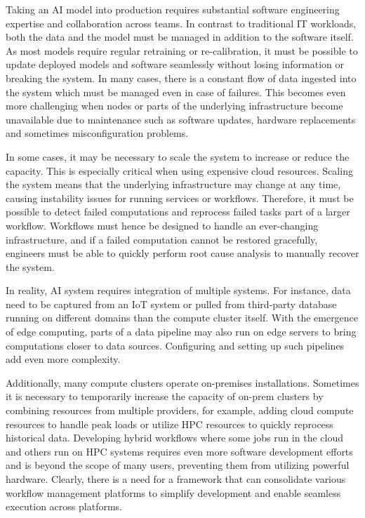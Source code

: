 \documentclass{article}
\begin{document}
Taking an AI model into production requires substantial software engineering expertise and collaboration across teams. In contrast to traditional IT workloads, both the data and the model must be managed in addition to the software itself. As most models require regular retraining or re-calibration, it must be possible to update deployed models and software seamlessly without losing information or breaking the system. In many cases, there is a constant flow of data ingested into the system which must be managed even in case of failures. This becomes even more challenging when nodes or parts of the underlying infrastructure become unavailable due to maintenance such as software updates, hardware replacements and sometimes misconfiguration problems.

In some cases, it may be necessary to scale the system to increase or reduce the capacity. This is especially critical when using expensive cloud resources. Scaling the system means that the underlying infrastructure may change at any time, causing instability issues for running services or workflows. Therefore, it must be possible to detect failed computations and reprocess failed tasks part of a larger workflow. Workflows must hence be designed to handle an ever-changing infrastructure, and if a failed computation cannot be restored gracefully, engineers must be able to quickly perform root cause analysis to manually recover the system.

In reality, AI system requires integration of multiple systems. For instance, data need to be captured from an IoT system or pulled from third-party database running on different domains than the compute cluster itself. With the emergence of edge computing, parts of a data pipeline may also run on edge servers to bring computations closer to data sources. Configuring and setting up such pipelines add even more complexity. 

Additionally, many compute clusters operate on-premises installations. Sometimes it is necessary to temporarily increase the capacity of on-prem clusters by combining resources from multiple providers, for example, adding cloud compute resources to handle peak loads or utilize HPC resources to quickly reprocess historical data. Developing hybrid workflows where some jobs run in the cloud and others run on HPC systems requires even more software development efforts \cite{wf_challenges} and is beyond the scope of many users, preventing them from utilizing powerful hardware. Clearly, there is a need for a framework that can consolidate various workflow management platforms to simplify development and enable seamless execution across platforms.
\end{document}

